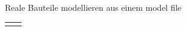 \begin{frame}[t]{Reale Bauteile modellieren aus einem model file}
\begin{spacing}{0.9}
\begin{tiny}
\begin{table}[h!]
\begin{tabular}{p{5cm} p{5cm}}
\begin{minipage}{0.5\textwidth}
            \end{minipage} 
      \end{tabular}
    \end{table}
    \end{tiny} \end{spacing}
\end{frame}